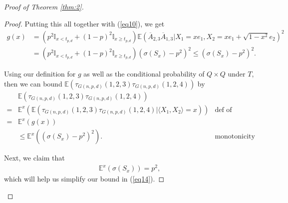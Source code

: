 \documentclass{article}
\begin{document}
\begin{proof}[Proof of Theorem \ref{thm:2}]
\begin{proof}
Putting this all together with (\ref{eq10}), we get
\begin{align}
    g(x) &= \left(p^2\mathbb{I}_{ x < t_{p,d}} + (1-p)^2\mathbb{I}_{ x \geq t_{p,d}} \right)\mathbb{E}\left(\overline{A}_{2,3}\overline{A}_{1,3} | X_1 = xe_1, X_2 = xe_1 + \sqrt{1-x^2}e_2\right)^2 \nonumber\\
    &= \left(p^2\mathbb{I}_{ x < t_{p,d}} + (1-p)^2\mathbb{I}_{ x \geq t_{p,d}} \right)(\sigma(S_x) - p^2)^2 \leq (\sigma(S_x) - p^2)^2\label{eq12}.
\end{align}

Using our definition for $g$ as well as the conditional probability of $Q \times Q$ under $T$, then we can bound $\mathbb{E}\left( \tau_{G(n,p,d)}(1,2,3)\tau_{G(n,p,d)}(1,2,4) \right)$ by
\begin{align}
    &\mathbb{E}\left( \tau_{G(n,p,d)}(1,2,3)\tau_{G(n,p,d)}(1,2,4) \right)\nonumber\\
    =&\mathbb{E}^x \left( \mathbb{E}\left( \tau_{G(n,p,d)}(1,2,3)\tau_{G(n,p,d)}(1,2,4) | \langle X_1, X_2 \rangle = x \right) \right) & \text{def of conditional probability}\nonumber\\
    =&\mathbb{E}^x \left( g(x) \right)\nonumber\\
    &\leq \mathbb{E}^x \left( (\sigma(S_x) - p^2)^2 \right).\label{eq14} &  \text{monotonicity}
\end{align}

Next, we claim that 
\begin{align*}
    \mathbb{E}^x(\sigma(S_x)) = p^2,
\end{align*}
which will help us simplify our bound in (\ref{eq14}). 


\end{proof}
\end{proof}
\end{document}
